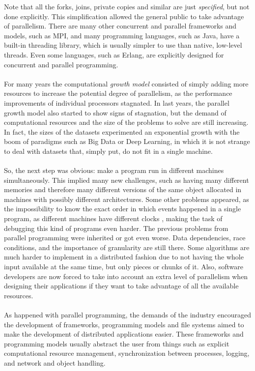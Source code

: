 Note that all the forks, joins, private copies and similar are just \textit{specified}, but not done explicitly. This simplification allowed the general public to take advantage of parallelism. There are many other concurrent and parallel frameworks and models, such as MPI\cite{Forum:1994:MMI:898758}, and many programming languages, such as Java, have a built-in threading library, which is usually simpler to use than native, low-level threads. Even some languages, such as Erlang, are explicitly designed for concurrent and parallel programming.\\
\\
For many years the computational \textit{growth model} consisted of simply adding more resources to increase the potential degree of parallelism, as the performance improvements of individual processors stagnated. In last years, the parallel growth model also started to show signs of stagnation, but the demand of computational resources and the size of the problems to solve are still increasing. In fact, the sizes of the datasets experimented an exponential growth with the boom of paradigms such as Big Data or Deep Learning, in which it is not strange to deal with datasets that, simply put, do not fit in a single machine.\\
\\
So, the next step was obvious: make a program run in different machines simultaneously. This implied many new challenges, such as having many different memories and therefore many different versions of the same object allocated in machines with possibly different architectures. Some other problems appeared, as the impossibility to know the exact order in which events happened in a single program, as different machines have different clocks \cite{Lamport}, making the task of debugging this kind of programs even harder. The previous problems from parallel programming were inherited or got even worse. Data dependencies, race conditions, and the importance of granularity are still there. Some algorithms are much harder to implement in a distributed fashion due to not having the whole input available at the same time, but only pieces or chunks of it. Also, software developers are now forced to take into account an extra level of parallelism when designing their applications if they want to take advantage of all the available resources.\\
\\
As happened with parallel programming, the demands of the industry encouraged the development of frameworks, programming models and file systems aimed to make the development of distributed applications easier. These frameworks and programming models usually abstract the user from things such as explicit computational resource management, synchronization between processes, logging, and network and object handling.\\
